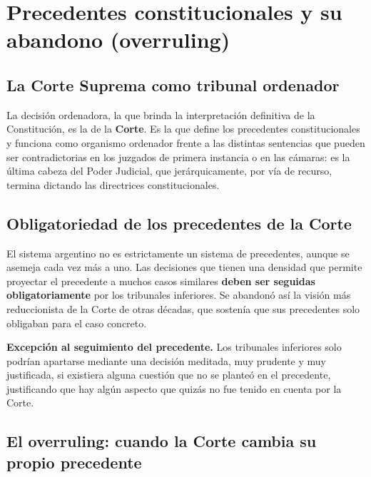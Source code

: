 \documentclass[12pt,oneside]{book}
\begin{document}
\chapter[Precedentes y overruling]{Precedentes constitucionales y su abandono (overruling)}

\section{La Corte Suprema como tribunal ordenador}

La decisión ordenadora, la que brinda la interpretación definitiva de la Constitución, es la de la \textbf{Corte}. Es la que define los precedentes constitucionales y funciona como organismo ordenador frente a las distintas sentencias que pueden ser contradictorias en los juzgados de primera instancia o en las cámaras: es la última cabeza del Poder Judicial, que jerárquicamente, por vía de recurso, termina dictando las directrices constitucionales.

\section{Obligatoriedad de los precedentes de la Corte}

El sistema argentino no es estrictamente un sistema de precedentes, aunque se asemeja cada vez más a uno. Las decisiones que tienen una densidad que permite proyectar el precedente a muchos casos similares \textbf{deben ser seguidas obligatoriamente} por los tribunales inferiores. Se abandonó así la visión más reduccionista de la Corte de otras décadas, que sostenía que sus precedentes solo obligaban para el caso concreto.

\begin{important}
\textbf{Excepción al seguimiento del precedente.} Los tribunales inferiores solo podrían apartarse mediante una decisión meditada, muy prudente y muy justificada, si existiera alguna cuestión que no se planteó en el precedente, justificando que hay algún aspecto que quizás no fue tenido en cuenta por la Corte.
\end{important}

\section{El overruling: cuando la Corte cambia su propio precedente}
\end{document}
